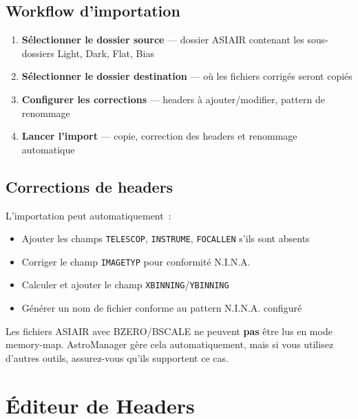 \documentclass[a4paper,11pt]{article}
\begin{document}
\subsection{Workflow d'importation}

\begin{enumerate}
    \item \textbf{S\'{e}lectionner le dossier source} --- dossier ASIAIR contenant les sous-dossiers Light, Dark, Flat, Bias
    \item \textbf{S\'{e}lectionner le dossier destination} --- o\`{u} les fichiers corrig\'{e}s seront copi\'{e}s
    \item \textbf{Configurer les corrections} --- headers \`{a} ajouter/modifier, pattern de renommage
    \item \textbf{Lancer l'import} --- copie, correction des headers et renommage automatique
\end{enumerate}

\subsection{Corrections de headers}

L'importation peut automatiquement~:

\begin{itemize}
    \item Ajouter les champs \texttt{TELESCOP}, \texttt{INSTRUME}, \texttt{FOCALLEN} s'ils sont absents
    \item Corriger le champ \texttt{IMAGETYP} pour conformit\'{e} N.I.N.A.
    \item Calculer et ajouter le champ \texttt{XBINNING}/\texttt{YBINNING}
    \item G\'{e}n\'{e}rer un nom de fichier conforme au pattern N.I.N.A. configur\'{e}
\end{itemize}

\begin{criticalbox}
Les fichiers ASIAIR avec BZERO/BSCALE ne peuvent \textbf{pas} \^{e}tre lus en mode memory-map. AstroManager g\`{e}re cela automatiquement, mais si vous utilisez d'autres outils, assurez-vous qu'ils supportent ce cas.
\end{criticalbox}


\section{\'{E}diteur de Headers}
\label{sec:headers}
\end{document}
